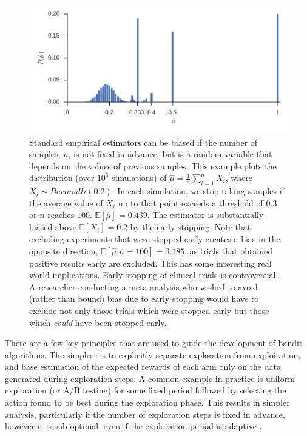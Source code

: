 \documentclass[11pt,a4paper,twoside]{report}
\newcommand{\E}[1]{\mathbb E\left[{#1}\right]}
\theoremstyle{plain}
\theoremstyle{definition}
\begin{document}
\begin{figure}[ht]
\centering
\includegraphics[scale=1]{extreme_early_stopping}
\caption{Standard empirical estimators can be biased if the number of samples, $n$, is not fixed in advance, but is a random variable that depends on the values of previous samples. This example plots the distribution (over $10^6$ simulations) of $\hat{\mu} = \frac{1}{n}\sum_{i=1}^n X_i$, where $X_i \sim Bernoulli(0.2)$. In each simulation, we stop taking samples if the average value of $X_i$ up to that point exceeds a threshold of $0.3$ or $n$ reaches $100$. $\E{\hat{\mu}} = 0.439$. The estimator is substantially biased above $\E{X_i} = 0.2$ by the early stopping. Note that excluding experiments that were stopped early creates a bias in the opposite direction, $\E{\hat{\mu}|n=100} = 0.185$, as trials that obtained positive results early are excluded. This has some interesting real world implications. Early stopping of clinical trials is controversial. A researcher conducting a meta-analysis who wished to avoid (rather than bound) bias due to early stopping would have to exclude not only those trials which were stopped early but those which \emph{could} have been stopped early.}
\label{fig:early_stopping}
\end{figure}

There are a few key principles that are used to guide the development of bandit algorithms. The simplest is to explicitly separate exploration from exploitation, and base estimation of the expected rewards of each arm only on the data generated during exploration steps. A common example in practice is uniform exploration (or A/B testing) for some fixed period followed by selecting the action found to be best during the exploration phase. This results in simpler analysis, particularly if the number of exploration steps is fixed in advance, however it is sub-optimal, even if the exploration period is adaptive \citep{NIPS2016_6179}. 
\end{document}
